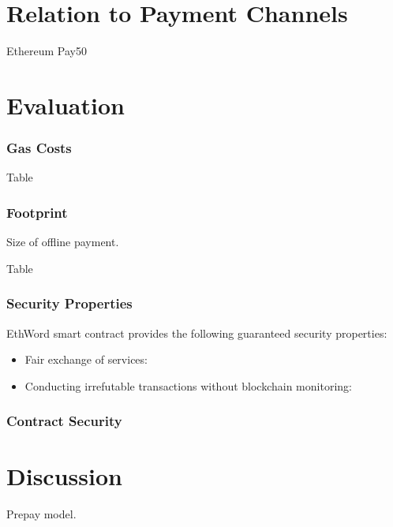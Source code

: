 
\section{Relation to Payment Channels}

Ethereum \textsf{Pay50} \cite{DF17}


\section{Evaluation}

\subsubsection{Gas Costs}

Table

\subsubsection{Footprint}

Size of offline payment.

Table

\subsubsection{Security Properties}

EthWord smart contract provides the following guaranteed security properties:
\begin{itemize}
	\item Fair exchange of services:
	\item Conducting irrefutable transactions without blockchain monitoring:
\end{itemize}

\subsubsection{Contract Security}



\section{Discussion}

Prepay model.














